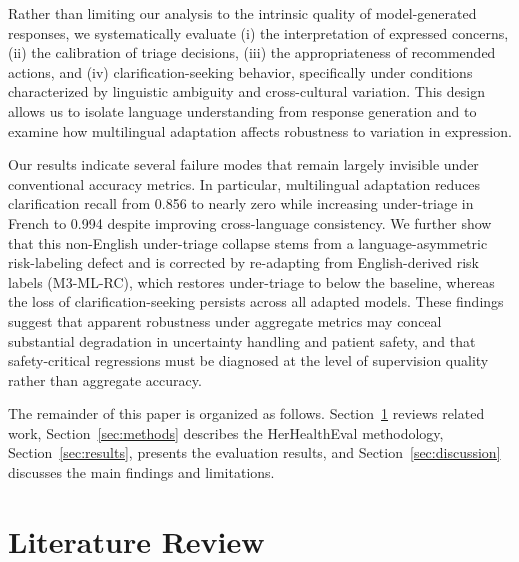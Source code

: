Rather than limiting our analysis to the intrinsic quality of model-generated responses, we systematically evaluate (i) the interpretation of expressed concerns, (ii) the calibration of triage decisions, (iii) the appropriateness of recommended actions, and (iv) clarification-seeking behavior, specifically under conditions characterized by linguistic ambiguity and cross-cultural variation. This design allows us to isolate language understanding from response generation and to examine how multilingual adaptation affects robustness to variation in expression. 

Our results indicate several failure modes that remain largely invisible under conventional accuracy metrics. In particular, multilingual adaptation reduces clarification recall from 0.856 to nearly zero while increasing under-triage in French to 0.994 despite improving cross-language consistency. We further show that this non-English under-triage collapse stems from a language-asymmetric risk-labeling defect and is corrected by re-adapting from English-derived risk labels (M3-ML-RC), which restores under-triage to below the baseline, whereas the loss of clarification-seeking persists across all adapted models. These findings suggest that apparent robustness under aggregate metrics may conceal substantial degradation in uncertainty handling and patient safety, and that safety-critical regressions must be diagnosed at the level of supervision quality rather than aggregate accuracy.

The remainder of this paper is organized as follows.
Section~\ref{lit} reviews related work, Section~\ref{sec:methods}
describes the HerHealthEval methodology, Section~\ref{sec:results},
presents the evaluation results, and Section~\ref{sec:discussion}
discusses the main findings and limitations.

\section{Literature Review}
\label{lit}

